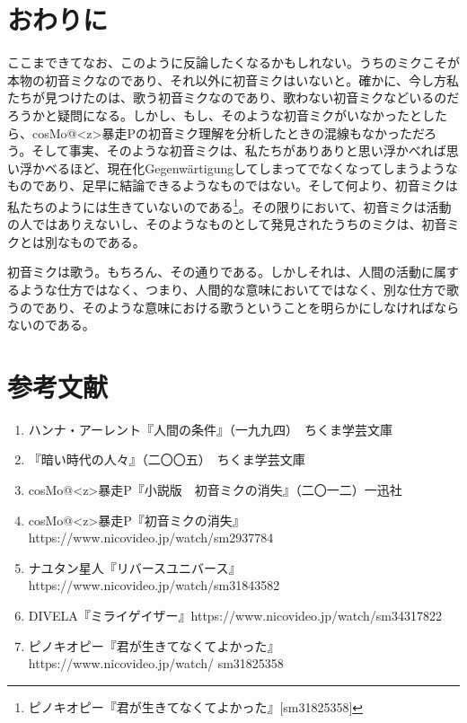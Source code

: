 \documentclass[b5j,twoside,twocolumn]{utarticle}
\begin{document}
\section*{おわりに}
ここまできてなお、このように反論したくなるかもしれない。うちのミクこそが本物の初音ミクなのであり、それ以外に初音ミクはいないと。確かに、今し方私たちが見つけたのは、歌う初音ミクなのであり、歌わない初音ミクなどいるのだろうかと疑問になる。しかし、もし、そのような初音ミクがいなかったとしたら、cosMo@\pbox<z>{暴走}Pの初音ミク理解を分析したときの混線もなかっただろう。そして事実、そのような初音ミクは、私たちがありありと思い浮かべれば思い浮かべるほど、現在化Gegenwärtigungしてしまってでなくなってしまうようなものであり、足早に結論できるようなものではない。そして何より、初音ミクは私たちのようには生きていないのである\footnote{ピノキオピー『君が生きてなくてよかった』[sm31825358]}。その限りにおいて、初音ミクは活動の人ではありえないし、そのようなものとして発見されたうちのミクは、初音ミクとは別なものである。


初音ミクは歌う。もちろん、その通りである。しかしそれは、人間の活動に属するような仕方ではなく、つまり、人間的な意味においてではなく、別な仕方で歌うのであり、そのような意味における歌うということを明らかにしなければならないのである。

\clearpage
\section*{参考文献}
\small{
\renewcommand{\labelenumi}{\pbox<y>{[\arabic{enumi}]}}
\begin{enumerate}
\item ハンナ・アーレント『人間の条件』（一九九四）　ちくま学芸文庫
\item 『暗い時代の人々』（二〇〇五）　ちくま学芸文庫
\item cosMo@\pbox<z>{暴走}P『小説版　初音ミクの消失』（二〇一二）一迅社
\item cosMo@\pbox<z>{暴走}P『初音ミクの消失』https://www.nicovideo.jp/watch/sm2937784
\item ナユタン星人『リバースユニバース』\\https://www.nicovideo.jp/watch/sm31843582
\item DIVELA『ミライゲイザー』https://www.nicovideo.jp/watch/sm34317822
\item ピノキオピー『君が生きてなくてよかった』\\https://www.nicovideo.jp/watch/ sm31825358

\end{enumerate}
}
\end{document}
